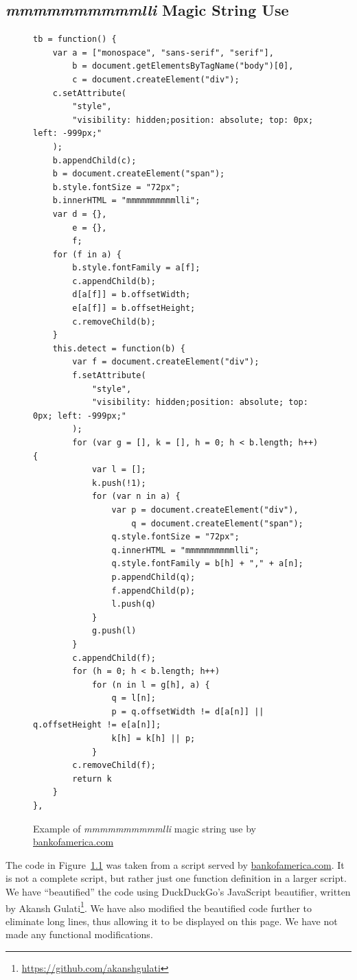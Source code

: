 \documentclass[
    fontsize=12pt,
    headings=small,
    parskip=half,
    bibliography=totoc,
    numbers=noenddot,
    open=any
    ]{scrreprt}
\begin{document}
\begin{appendices}
\chapter{\textit{mmmmmmmmmmlli} Magic String Use}
\begin{figure}
\begin{verbatim}
tb = function() {
    var a = ["monospace", "sans-serif", "serif"],
        b = document.getElementsByTagName("body")[0],
        c = document.createElement("div");
    c.setAttribute(
        "style",
        "visibility: hidden;position: absolute; top: 0px; left: -999px;"
    );
    b.appendChild(c);
    b = document.createElement("span");
    b.style.fontSize = "72px";
    b.innerHTML = "mmmmmmmmmmlli";
    var d = {},
        e = {},
        f;
    for (f in a) {
        b.style.fontFamily = a[f];
        c.appendChild(b);
        d[a[f]] = b.offsetWidth;
        e[a[f]] = b.offsetHeight;
        c.removeChild(b);
    }
    this.detect = function(b) {
        var f = document.createElement("div");
        f.setAttribute(
            "style",
            "visibility: hidden;position: absolute; top: 0px; left: -999px;"
        );
        for (var g = [], k = [], h = 0; h < b.length; h++) {
            var l = [];
            k.push(!1);
            for (var n in a) {
                var p = document.createElement("div"),
                    q = document.createElement("span");
                q.style.fontSize = "72px";
                q.innerHTML = "mmmmmmmmmmlli";
                q.style.fontFamily = b[h] + "," + a[n];
                p.appendChild(q);
                f.appendChild(p);
                l.push(q)
            }
            g.push(l)
        }
        c.appendChild(f);
        for (h = 0; h < b.length; h++)
            for (n in l = g[h], a) {
                q = l[n];
                p = q.offsetWidth != d[a[n]] || q.offsetHeight != e[a[n]];
                k[h] = k[h] || p;
            }
        c.removeChild(f);
        return k
    }
},
\end{verbatim}
\caption{Example of \textit{mmmmmmmmmmlli} magic string use by \url{bankofamerica.com}}
\label{app:mmmmmmmmmmlli}
\end{figure}

The code in Figure~\ref{app:mmmmmmmmmmlli} was taken from a script served by \url{bankofamerica.com}.
It is not a complete script, but rather just one function definition in a larger script.
We have ``beautified'' the code using DuckDuckGo's JavaScript beautifier, written by Akansh Gulati\footnote{\url{https://github.com/akanshgulati}}.
We have also modified the beautified code further to eliminate long lines, thus allowing it to be displayed
on this page.
We have not made any functional modifications.


\end{appendices}
\end{document}
